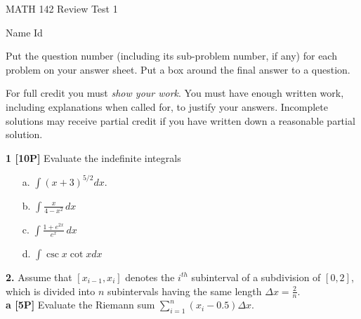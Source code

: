 \documentclass[12pt]{article}
\begin{document}
\begin{large}
\begin{bf}
\hspace{.75in}
{MATH 142 \quad Review Test 1} %
\hspace{1in}
\parbox{1in}{ Name \newline Id}
\end{bf}
\end{large}

\vspace{0.2in}

Put the question number (including its sub-problem number, if any) for each 
problem on your answer sheet. 
Put a box around the final answer to a question.

\vspace*{.02in}
For full credit you must \emph{show your work}. You must have enough
written work, including explanations when called for, to justify your
answers. Incomplete solutions may receive partial credit if you have
written down a reasonable partial solution. %
                 

\vspace{.25in}

{\bf 1 [10P]} Evaluate the indefinite integrals
\begin{enumerate}
\item[a.] \; ${\displaystyle \int (x+3)^{5/2}dx }$.
\item[b.] \; ${\displaystyle \int \frac{x}{4 - x^2}\, dx \,  }$
\item[c.] \; ${\displaystyle \int \frac{1 + e^{2x}}{e^{x}}\, dx \, }$
\item[d.] \; ${\displaystyle \int  \csc x\cot x dx} $
\end{enumerate}


{\bf 2.} Assume that ${\displaystyle [x_{i-1},x_i]}$ denotes the
$i^{th}$ subinterval of a subdivision of $[0,2]$,
which is divided into $n$ subintervals having the same length ${\displaystyle
\Delta x = \frac{2}{n}}$. \\
{\bf a [5P]} Evaluate the Riemann sum ${\displaystyle
\sum_{i=1}^n \left(x_i -0.5\right)\Delta x}$.
\end{document}
